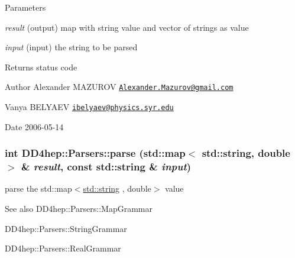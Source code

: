 \begin{DoxyParams}{Parameters}
\item[{\em result}](output) map with string value and vector of strings as value \item[{\em input}](input) the string to be parsed \end{DoxyParams}
\begin{DoxyReturn}{Returns}
status code
\end{DoxyReturn}
\begin{DoxyAuthor}{Author}
Alexander MAZUROV \href{mailto:Alexander.Mazurov@gmail.com}{\tt Alexander.Mazurov@gmail.com} 

Vanya BELYAEV \href{mailto:ibelyaev@physics.syr.edu}{\tt ibelyaev@physics.syr.edu} 
\end{DoxyAuthor}
\begin{DoxyDate}{Date}
2006-\/05-\/14 
\end{DoxyDate}
\hypertarget{namespace_d_d4hep_1_1_parsers_a3bb4178f3175f409b144ff5629463c14}{
\subsubsection[{parse}]{\setlength{\rightskip}{0pt plus 5cm}int DD4hep::Parsers::parse (std::map$<$ std::string, double $>$ \& {\em result}, \/  const std::string \& {\em input})}}
\label{namespace_d_d4hep_1_1_parsers_a3bb4178f3175f409b144ff5629463c14}


parse the {\ttfamily std::map$<$\hyperlink{classstd_1_1string}{std::string} , double$>$} value \begin{DoxySeeAlso}{See also}
DD4hep::Parsers::MapGrammar 

DD4hep::Parsers::StringGrammar 

DD4hep::Parsers::RealGrammar 
\end{DoxySeeAlso}

